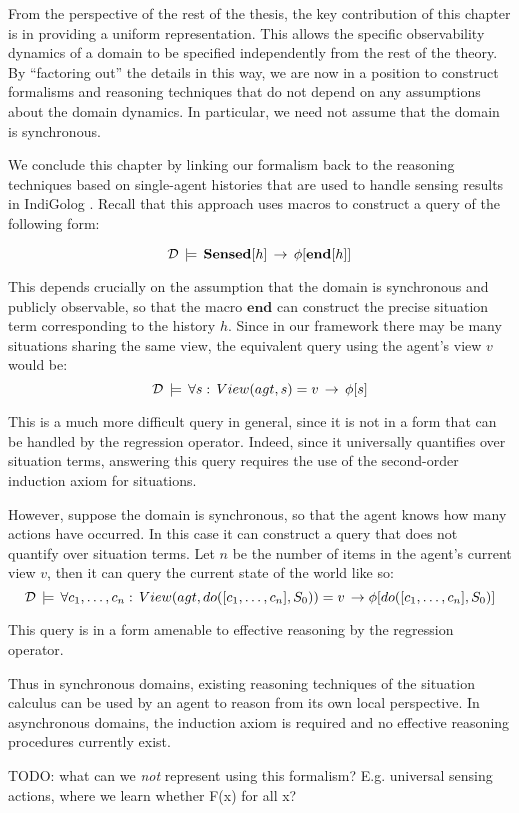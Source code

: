 From the perspective of the rest of the thesis, the key contribution
of this chapter is in providing a uniform representation. This allows
the specific observability dynamics of a domain to be specified independently
from the rest of the theory. By {}``factoring out'' the details
in this way, we are now in a position to construct formalisms and
reasoning techniques that do not depend on any assumptions about the
domain dynamics. In particular, we need not assume that the domain
is synchronous.

We conclude this chapter by linking our formalism back to the reasoning
techniques based on single-agent histories that are used to handle
sensing results in IndiGolog \citep{giacomo99indigolog}. Recall that
this approach uses macros to construct a query of the following form:

\[
\mathcal{D}\,\models\,\mathbf{Sensed}[h]\,\rightarrow\,\phi[\mathbf{end}[h]]\]


This depends crucially on the assumption that the domain is synchronous
and publicly observable, so that the macro $\mathbf{end}$ can construct
the precise situation term corresponding to the history $h$. Since
in our framework there may be many situations sharing the same view,
the equivalent query using the agent's view $v$ would be:\[
\mathcal{D}\,\models\,\forall s:\, View(agt,s)=v\,\rightarrow\,\phi[s]\]


This is a much more difficult query in general, since it is not in
a form that can be handled by the regression operator. Indeed, since
it universally quantifies over situation terms, answering this query
requires the use of the second-order induction axiom for situations.

However, suppose the domain is synchronous, so that the agent knows
how many actions have occurred. In this case it can construct a query
that does not quantify over situation terms. Let $n$ be the number
of items in the agent's current view $v$, then it can query the current
state of the world like so:\[
\mathcal{D}\,\models\,\forall c_{1},\dots,c_{n}:\, View(agt,do([c_{1},\dots,c_{n}],S_{0}))=v\,\rightarrow\phi[do([c_{1},\dots,c_{n}],S_{0})]\]


This query is in a form amenable to effective reasoning by the regression
operator.

Thus in synchronous domains, existing reasoning techniques of the
situation calculus can be used by an agent to reason from its own
local perspective. In asynchronous domains, the induction axiom is
required and no effective reasoning procedures currently exist.

TODO: what can we \emph{not} represent using this formalism? E.g.
universal sensing actions, where we learn whether F(x) for all x?

